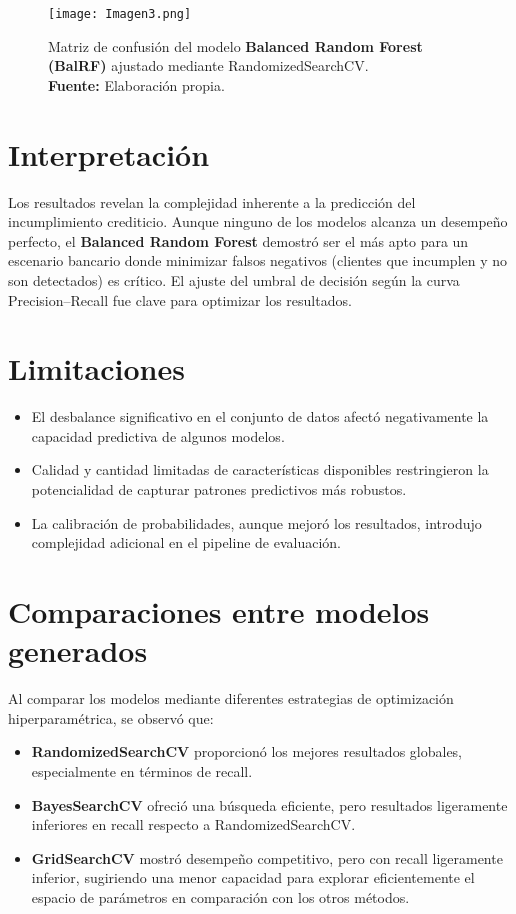 \documentclass[journal]{apa7}
\begin{document}
\begin{figure}[H]
  \centering
  \texttt{[image: Imagen3.png]}
  \caption[Matriz de Confusión de BalRF]{Matriz de confusión del modelo \textbf{Balanced Random Forest (BalRF)} ajustado mediante RandomizedSearchCV.\\\textbf{Fuente:} Elaboración propia.}
  \label{fig:matriz-confusion-balrf}
\end{figure}

\section{Interpretación}

Los resultados revelan la complejidad inherente a la predicción del incumplimiento crediticio. Aunque ninguno de los modelos alcanza un desempeño perfecto, el \textbf{Balanced Random Forest} demostró ser el más apto para un escenario bancario donde minimizar falsos negativos (clientes que incumplen y no son detectados) es crítico. El ajuste del umbral de decisión según la curva Precision–Recall fue clave para optimizar los resultados.

\section{Limitaciones}

\begin{itemize}
  \item El desbalance significativo en el conjunto de datos afectó negativamente la capacidad predictiva de algunos modelos.
  \item Calidad y cantidad limitadas de características disponibles restringieron la potencialidad de capturar patrones predictivos más robustos.
  \item La calibración de probabilidades, aunque mejoró los resultados, introdujo complejidad adicional en el pipeline de evaluación.
\end{itemize}

\section{Comparaciones entre modelos generados}

Al comparar los modelos mediante diferentes estrategias de optimización hiperparamétrica, se observó que:

\begin{itemize}
  \item \textbf{RandomizedSearchCV} proporcionó los mejores resultados globales, especialmente en términos de recall.
  \item \textbf{BayesSearchCV} ofreció una búsqueda eficiente, pero resultados ligeramente inferiores en recall respecto a RandomizedSearchCV.
  \item \textbf{GridSearchCV} mostró desempeño competitivo, pero con recall ligeramente inferior, sugiriendo una menor capacidad para explorar eficientemente el espacio de parámetros en comparación con los otros métodos.
\end{itemize}
\end{document}
